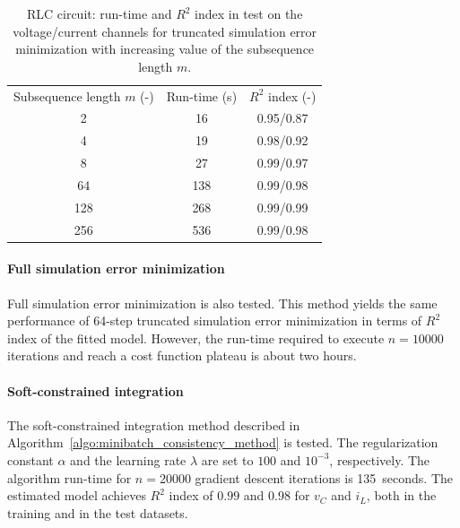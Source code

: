 \documentclass{article} %
\newcommand{\numiter}{n}
\begin{document}
\begin{table}
{
\begin{tabular}{c|cc}
 Subsequence length $m$ (-) & Run-time (s)&  $R^2$ index (-)\\ 
\cline{1-3}
  2  & 16 & 0.95/0.87 \\
  4  & 19 &  0.98/0.92 \\
  8  & 27&  0.99/0.97  \\
  64  & 138&  0.99/0.98  \\
  128  & 268&  0.99/0.99  \\
  256   &536 & 0.99/0.98
\end{tabular}
\caption{{RLC circuit: run-time and $R^2$ index in test on the voltage/current channels for truncated simulation error minimization with increasing value of the subsequence length $m$.}}
\label{tbl:window_sensitivity}
}
\end{table}



\paragraph{Full simulation error minimization}
Full simulation error minimization is also tested. This method yields the same performance of 64-step truncated simulation error minimization in terms of $R^2$ index of the fitted model. However, the run-time required to execute $\numiter=10000$ iterations and reach a cost function plateau is about two hours.


\paragraph{Soft-constrained integration}
{
The soft-constrained integration method described in Algorithm~\ref{algo:minibatch_consistency_method} is tested.
The regularization constant $\alpha$ and the learning rate $\lambda$ are set to $100$ and $10^{-3}$, respectively.
The algorithm run-time for $\numiter=20000$ gradient descent iterations is 135~seconds.
}
{The estimated model achieves $R^2$ index of $0.99$ and $0.98$ for $v_C$ and $i_L$, both in the training and in the test datasets.
}
\end{document}
